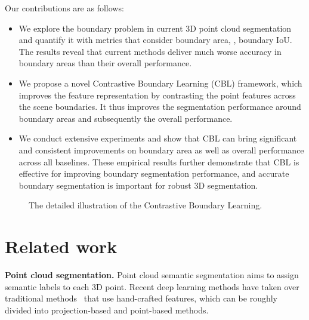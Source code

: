 \documentclass[10pt,twocolumn,letterpaper]{article}
\begin{document}
Our contributions are as follows:
\begin{itemize}
    \setlength\itemsep{-0.1em}
    \item We explore the boundary problem in current 3D point cloud segmentation and quantify it with metrics that consider boundary area, \eg, boundary IoU. The results reveal that current methods deliver much worse accuracy in boundary areas than their overall performance.

    \item We propose a novel Contrastive Boundary Learning (CBL) framework, which improves the feature representation by contrasting the point features across the scene boundaries. It thus improves the segmentation performance around boundary areas and subsequently the overall performance.

    \item We conduct extensive experiments and show that CBL can bring significant and consistent improvements on boundary area as well as overall performance across all baselines. These empirical results further demonstrate that CBL is effective for improving boundary segmentation performance, and accurate boundary segmentation is important for robust 3D segmentation.  
\end{itemize}

\begin{figure*}
\begin{center}
\end{center}
\caption{The detailed illustration of the Contrastive Boundary Learning.}
\label{fig:contrast}
\end{figure*}

\section{Related work}

\noindent\textbf{Point cloud segmentation.}
Point cloud semantic segmentation aims to assign semantic labels to each 3D point. Recent deep learning methods have taken over traditional methods~\cite{hf_hist, hf_struct} that use hand-crafted features, which can be roughly divided into projection-based and point-based methods.
\end{document}
